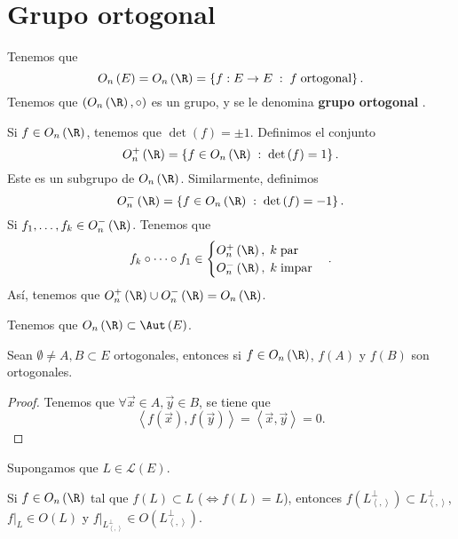 \section{Grupo ortogonal}
\begin{observation}
\normalfont Tenemos que
\[ O_{n}\left(E\right) = O_{n}\left(\R\right) = \left\{ f : E \to E \; : \; f \; \text{ortogonal}\right\}  .\]
Tenemos que $\displaystyle \left(O_{n}\left(\R\right), \circ \right) $ es un grupo, y se le denomina \textbf{grupo ortogonal} .
\end{observation}
Si $\displaystyle f \in O_{n}\left(\R\right) $, tenemos que $\displaystyle \det\left(f\right) = \pm 1 $. Definimos el conjunto
\[ O^{+}_{n}\left(\R\right) = \left\{ f \in O_{n}\left(\R\right) \; : \; \det\left(f\right) = 1\right\}  .\]
Este es un subgrupo de $\displaystyle O_{n}\left(\R\right) $. Similarmente, definimos
\[ O^{-}_{n}\left(\R\right) = \left\{ f \in O_{n}\left(\R\right) \; : \; \det\left(f\right) = -1\right\}  .\]
Si $\displaystyle f_{1}, \ldots, f_{k} \in O^{-}_{n}\left(\R\right) $. Tenemos que 
\[ f_{k}\circ \cdots \circ f_{1} \in 
\begin{cases}
O^{+}_{n}\left(\R\right),\; k \; \text{par} \\
O^{-}_{n}\left(\R\right), \; k \; \text{impar}
\end{cases}
.\]
Así, tenemos que $\displaystyle O^{+}_{n}\left(\R\right) \cup O^{-}_{n}\left(\R\right) = O_{n}\left(\R\right) $.
\begin{observation}
\normalfont Tenemos que $\displaystyle O_{n}\left(\R\right) \subset \Aut\left(E\right) $. 
\end{observation}
\begin{fprop}[]
\normalfont Sean $\displaystyle \emptyset\neq A,B \subset E $ ortogonales, entonces si $\displaystyle f \in O_{n}\left(\R\right) $, $\displaystyle f\left(A\right) $ y $\displaystyle f\left(B\right) $ son ortogonales.
\end{fprop}
\begin{proof}
Tenemos que $\displaystyle \forall \vec{x} \in A, \vec{y} \in B $, se tiene que 
\[\left\langle f\left(\vec{x}\right), f\left(\vec{y}\right) \right\rangle = \left\langle \vec{x}, \vec{y} \right\rangle = 0.\]
\end{proof}
Supongamos que $\displaystyle L \in \mathcal{L}\left(E\right) $. 
\begin{fprop}[]
\normalfont Si $\displaystyle f \in O_{n}\left(\R\right) $ tal que $\displaystyle f\left(L\right) \subset L $ ($\displaystyle \iff f\left(L\right) = L $), entonces $\displaystyle f\left(L^{\perp}_{\left\langle ,  \right\rangle }\right) \subset L^{\perp }_{\left\langle ,  \right\rangle } $, $\displaystyle f|_{L} \in O\left(L\right) $ y $\displaystyle f|_{L^{\perp }_{\left\langle ,  \right\rangle }} \in O\left(L^{\perp}_{\left\langle ,  \right\rangle }\right)$.
\end{fprop}
